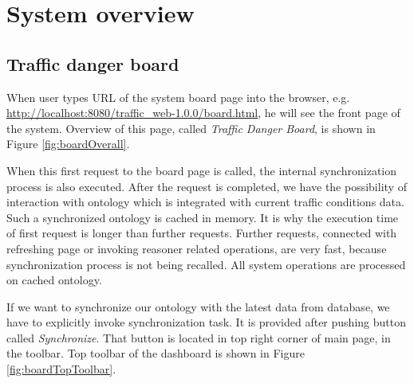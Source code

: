 \section{System overview}
\label{sec:systemOverview}

\subsection{Traffic danger board}
\label{sub:trafficDangerBoard}

When user types URL of the system board page into the browser, e.g. \url{http://localhost:8080/traffic_web-1.0.0/board.html}, he will see the front page of the system. Overview of this page, called \textit{Traffic Danger Board}, is shown in Figure \ref{fig:boardOverall}.


When this first request to the board page is called, the internal synchronization process is also executed. After the request is completed, we have the possibility of interaction with ontology which is integrated with current traffic conditions data. Such a synchronized ontology is cached in memory. It is why the execution time of first request is longer than further requests. Further requests, connected with refreshing page or invoking reasoner related operations, are very fast, because synchronization process is not being recalled. All system operations are processed on cached ontology. 

\newpage

\noindent If we want to synchronize our ontology with the latest data from database, we have to explicitly invoke synchronization task. It is provided after pushing button called \textit{Synchronize}. That button is located in top right corner of main page, in the toolbar. Top toolbar of the dashboard is shown in Figure \ref{fig:boardTopToolbar}.

